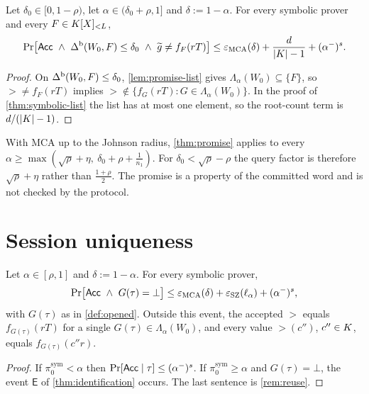 \begin{theorem}\label{thm:promise}
Let $\delta_0\in[0,1-\rho)$, let $\alpha\in(\delta_0+\rho,1]$ and $\delta:=1-\alpha$. For
every symbolic prover and every $F\in K[X]_{<L}$,
\[
\Pr\bigl[\Acc\ \wedge\ \Db(W_0,F)\le\delta_0\ \wedge\ \gt\ne f_F(rT)\bigr]
\le\eps_{\MCA}(\delta)+\frac{d}{|\K|-1}+(\alpha^-)^s .
\]
\end{theorem}

\begin{proof}
On $\Delta^{\mathrm{b}}(W_0,F)\le\delta_0$, \cref{lem:promise-list} gives $\Lambda_\alpha(W_0)\subseteq\{F\}$,
so $\gt\ne f_F(rT)$ implies $\gt\notin\{f_G(rT):G\in\Lambda_\alpha(W_0)\}$. In the proof of
\cref{thm:symbolic-list} the list has at most one element, so the root-count term is
$d/(|K|-1)$.
\end{proof}

\begin{remark}\label{rem:promise-johnson}
With MCA up to the Johnson radius, \cref{thm:promise} applies to every
$\alpha\ge\max(\sqrt\rho+\eta,\ \delta_0+\rho+\tfrac1{n_1})$. For $\delta_0<\sqrt\rho-\rho$ the
query factor is therefore $\sqrt\rho+\eta$ rather than $\frac{1+\rho}2$. The promise is a
property of the committed word and is not checked by the protocol.
\end{remark}

\section{Session uniqueness}

\begin{theorem}\label{thm:session}
Let $\alpha\in[\rho,1]$ and $\delta:=1-\alpha$. For every symbolic prover,
\[
\Pr\bigl[\Acc\ \wedge\ G(\tau)=\bot\bigr]\le\eps_{\MCA}(\delta)+\eps_{\mathrm{SZ}}(\ell_\alpha)+(\alpha^-)^s,
\]
with $G(\tau)$ as in \cref{def:opened}. Outside this event, the accepted $\gt$ equals
$f_{G(\tau)}(rT)$ for a single $G(\tau)\in\Lambda_\alpha(W_0)$, and every value
$\gt(c'')$, $c''\in K$, equals $f_{G(\tau)}(c''r)$.
\end{theorem}

\begin{proof}
If $\pi^{\mathrm{sym}}_0<\alpha$ then $\Pr[\mathsf{Acc}\mid\tau]\le(\alpha^-)^s$. If
$\pi^{\mathrm{sym}}_0\ge\alpha$ and $G(\tau)=\bot$, the event $\mathsf E$ of
\cref{thm:identification} occurs. The last sentence is \cref{rem:reuse}.
\end{proof}

